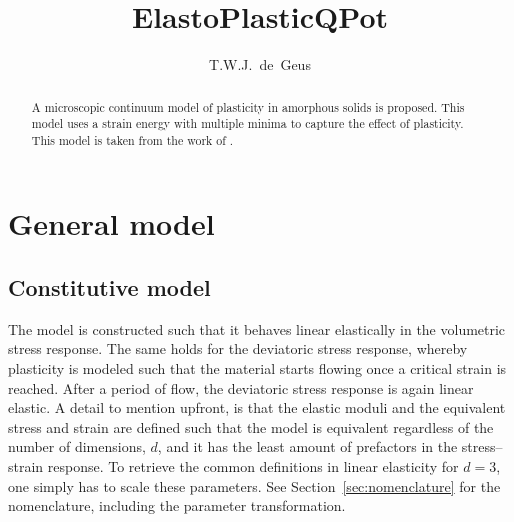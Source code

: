 \documentclass[times,namecite]{goose-article}
\title{%
  ElastoPlasticQPot
}
\author{T.W.J.~de~Geus}
\begin{document}
\maketitle

\begin{abstract}
A microscopic continuum model of plasticity in amorphous solids is proposed. This model uses a strain energy with multiple minima to capture the effect of plasticity. This model is taken from the work of \citet{Jagla2017}.
\end{abstract}


\setcounter{tocdepth}{3}
\tableofcontents

\vfill\newpage
\section{General model}

\subsection{Constitutive model}

The model is constructed such that it behaves linear elastically in the volumetric stress response. The same holds for the deviatoric stress response, whereby plasticity is modeled such that the material starts flowing once a critical strain is reached. After a period of flow, the deviatoric stress response is again linear elastic. A detail to mention upfront, is that the elastic moduli and the equivalent stress and strain are defined such that the model is equivalent regardless of the number of dimensions, $d$, and it has the least amount of prefactors in the stress--strain response. To retrieve the common definitions in linear elasticity for $d = 3$, one simply has to scale these parameters. See Section~\ref{sec:nomenclature} for the nomenclature, including the parameter transformation.
\end{document}
